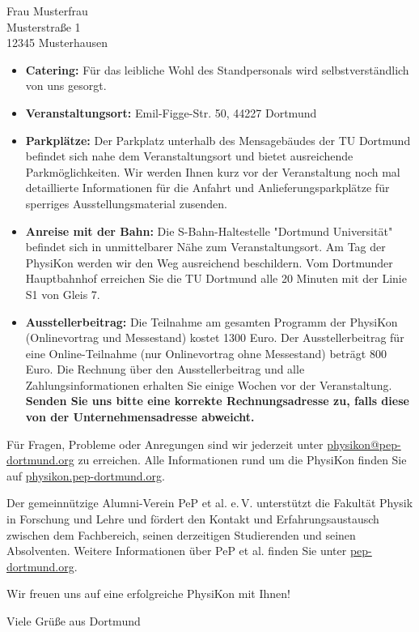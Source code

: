 \documentclass[
  pepbrief,
  fontsize=12pt,
  paper=a4,
  DIV=14,
  parskip=half,
  backaddress=false,
]{scrlttr2}
\begin{document}
\begin{letter}{%
  Frau Musterfrau \\
  Musterstraße 1 \\
  12345 Musterhausen
}
\begin{itemize}
    aktuell sind, werden wir Sie einige Wochen vor der Veranstaltung bitten, uns Stellenangebote zuzusenden. 
    Sie können die Jobbörse aber auch gerne schon vorab nutzen, wenn sie aktuelle Stellenausschreibungen haben.
    Unsere Jobbörse ist unabhängig von der PhysiKon immer online.
    \item \textbf{Catering:} Für das leibliche Wohl des Standpersonals wird selbstverständlich von uns gesorgt.
    \item \textbf{Veranstaltungsort:} Emil-Figge-Str. 50, 44227 Dortmund
    \item \textbf{Parkplätze:} Der Parkplatz unterhalb des Mensagebäudes der TU Dortmund befindet sich nahe dem Veranstaltungsort und bietet  
    ausreichende Parkmöglichkeiten. Wir werden Ihnen kurz vor der Veranstaltung noch mal detaillierte Informationen für die Anfahrt und Anlieferungsparkplätze für sperriges Ausstellungsmaterial zusenden. 
    \item \textbf{Anreise mit der Bahn:} Die S-Bahn-Haltestelle "Dortmund Universität" befindet sich in unmittelbarer Nähe zum Veranstaltungsort.
    Am Tag der PhysiKon werden wir den Weg ausreichend beschildern.
    Vom Dortmunder Hauptbahnhof erreichen Sie die TU Dortmund alle 20 Minuten mit der Linie S1 von Gleis 7.
    \item \textbf{Ausstellerbeitrag:} Die Teilnahme am gesamten Programm der PhysiKon (Onlinevortrag und Messestand) kostet 1300 Euro.
    Der Ausstellerbeitrag für eine Online-Teilnahme (nur Onlinevortrag ohne Messestand) beträgt 800 Euro.
    Die Rechnung über den Ausstellerbeitrag und alle Zahlungsinformationen erhalten Sie einige Wochen vor der Veranstaltung.
    \textbf{Senden Sie uns bitte eine korrekte Rechnungsadresse zu, falls diese von der Unternehmensadresse abweicht.}
\end{itemize}

Für Fragen, Probleme oder Anregungen sind wir jederzeit unter \href{mailto:physikon@pep-dortmund.org}{physikon@pep-dortmund.org} zu erreichen. 
Alle Informationen rund um die PhysiKon finden Sie auf \href{https://physikon.pep-dortmund.org/}{physikon.pep-dortmund.org}.

Der gemeinnützige Alumni-Verein PeP et al. e.\,V. unterstützt die Fakultät Physik in Forschung und Lehre und fördert den Kontakt und Erfahrungsaustausch zwischen dem Fachbereich,
seinen derzeitigen Studierenden und seinen Absolventen.
Weitere Informationen über PeP et al. finden Sie unter
\href{https://pep-dortmund.org/}{pep-dortmund.org}.

Wir freuen uns auf eine erfolgreiche PhysiKon mit Ihnen!

\closing{Viele Grüße aus Dortmund}

\end{letter}
\end{document}
